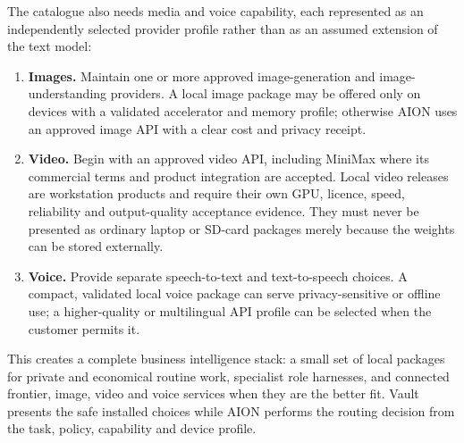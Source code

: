 The catalogue also needs media and voice capability, each represented as an
independently selected provider profile rather than as an assumed extension of
the text model:
\begin{enumerate}
  \item \textbf{Images.}  Maintain one or more approved image-generation and
  image-understanding providers.  A local image package may be offered only on
  devices with a validated accelerator and memory profile; otherwise AION uses
  an approved image API with a clear cost and privacy receipt.
  \item \textbf{Video.}  Begin with an approved video API, including MiniMax
  where its commercial terms and product integration are accepted.  Local video
  releases are workstation products and require their own GPU, licence, speed,
  reliability and output-quality acceptance evidence.  They must never be
  presented as ordinary laptop or SD-card packages merely because the weights
  can be stored externally.
  \item \textbf{Voice.}  Provide separate speech-to-text and text-to-speech
  choices.  A compact, validated local voice package can serve privacy-sensitive
  or offline use; a higher-quality or multilingual API profile can be selected
  when the customer permits it.
\end{enumerate}

This creates a complete business intelligence stack: a small set of local
packages for private and economical routine work, specialist role harnesses,
and connected frontier, image, video and voice services when they are the
better fit.  Vault presents the safe installed choices while AION performs the
routing decision from the task, policy, capability and device profile.
